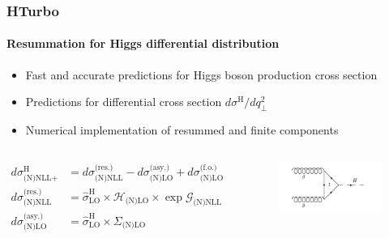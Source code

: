 \documentclass[aspectratio=43]{beamer}
\begin{document}
\begin{frame}
	
	\frametitle{HTurbo}
	\framesubtitle{Resummation for Higgs differential distribution}

	\footnotesize
	
	\begin{itemize}
		\item Fast and accurate predictions for Higgs boson production cross section
		\item Predictions for differential cross section $d\sigma^{\textrm{H}} / dq_{\perp}^{2}$
		\item Numerical implementation of resummed and finite components
	\end{itemize}

	\begin{columns}
		

		\begin{align}
			d\sigma^{\textrm{H}}_{\textrm{(N)NLL+(N)LO}} &= 
			d\sigma^{\textrm{(res.)}}_{\textrm{(N)NLL}} - 
			d\sigma^{\textrm{(asy.)}}_{\textrm{(N)LO}} + 
			d\sigma^{\textrm{(f.o.)}}_{\textrm{(N)LO}} \nonumber \\
			d\sigma^{\textrm{(res.)}}_{\textrm{(N)NLL}} &= \hat{\sigma}^{\textrm{H}}_{\textrm{LO}} \times \mathcal{H}_{\textrm{(N)LO}} \times \exp{\mathcal{G}}_{\textrm{(N)NLL}} \; \nonumber \\
			d\sigma^{\textrm{(asy.)}}_{\textrm{(N)LO}} &= \hat{\sigma}^{\textrm{H}}_{\textrm{LO}} \times \Sigma_{\textrm{(N)LO}} \nonumber
		\end{align}
	
		
		\begin{figure}
			\includegraphics[width = 5 cm]{plots/part3/chapter5/higgs.png}
		\end{figure}	
		
	\end{columns}

\end{frame}
\end{document}
